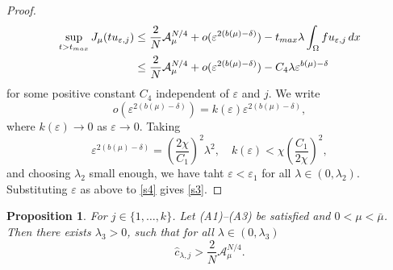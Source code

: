 \documentclass[10pt,a4paper]{amsart}
\numberwithin{equation}{section}
\newtheorem{proposition}[theorem]{Proposition}
\begin{document}
\begin{proof}
\begin{align*}
 \sup_{t> t_{\rm max}}J_{\mu}(tu_{\varepsilon, j})
 &\leq \frac{2}{N}\mathcal{A}_{\mu}^{N/4}+o(\varepsilon^{2(b(\mu)-\delta)})-t_{\rm max}\lambda \int_{\Omega}fu_{\varepsilon, j}\,dx\\
 &\leq \frac{2}{N}\mathcal{A}_{\mu}^{N/4}+o(\varepsilon^{2(b(\mu)-\delta)})-C_4\lambda \varepsilon^{b(\mu)-\delta}
\end{align*}
for some positive constant $C_4$ independent of $\varepsilon$ and $j$. We write
\[
 o(\varepsilon^{2(b(\mu)-\delta)})=k(\varepsilon )\varepsilon^{2(b(\mu)-\delta)},
\]
where \(k(\varepsilon )\to 0\) as \(\varepsilon \to 0\). Taking
\begin{equation}\label{s4}
 \varepsilon ^{2(b(\mu)-\delta)}=(\frac{2\chi}{C_1})^2\lambda^2, \quad
  k(\varepsilon)< \chi(\frac{C_1}{2\chi})^2,
\end{equation}
and choosing \(\lambda_2\) small enough, we have taht
 \(\varepsilon< \varepsilon_1\) 
for all \(\lambda\in (0,\lambda_2)\). 
Substituting \(\varepsilon\) as above to \eqref{s4} gives \eqref{s3}.
 \end{proof}

\begin{proposition}\label{p3}
For \(j\in \{1,\dots,k\}\). Let {\rm (A1)--(A3)} be satisfied and 
\(0<\mu<\bar{\mu}\). Then there exists \(\lambda_3>0\), such that for all
\(\lambda\in(0,\lambda_3)\)
\[
 \hat{c}_{\lambda, j}> \frac{2}{N}\mathcal{A}_{\mu}^{N/4}.
\]
\end{proposition}
 
\end{document}
